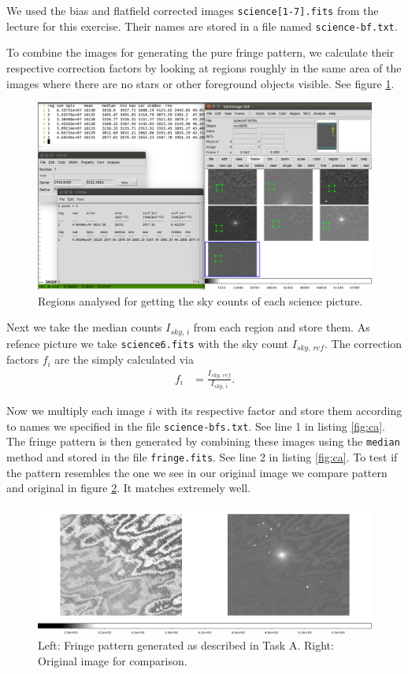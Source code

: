 \documentclass[11pt,a4paper,twoside]{article}
\begin{document}
We used the bias and flatfield corrected images \verb+science[1-7].fits+ from
the lecture for this exercise. Their names are stored in a file named 
\verb+science-bf.txt+.

To combine the images for generating the pure fringe pattern, we calculate their
respective correction factors by looking at regions roughly in the same area
of the images where there are no stars or other foreground objects visible.
See figure \ref{fig:reg}.

\begin{figure}[h!]
\centering
\includegraphics[width=\linewidth]{../pic/regions}
\caption{Regions analysed for getting the sky counts of each science picture.}
\label{fig:reg}
\end{figure}

Next we take the median counts $I_{sky,\,i}$ from each region and store them.
As refence picture we take \verb+science6.fits+ with the sky count $I_{sky,\,ref}$.
The correction factors $f_i$ are the simply calculated via
\begin{align}
    f_i &= \frac{I_{sky,\,ref}}{I_{sky,\,i}} .
\end{align}

Now we multiply each image $i$ with its respective factor and store them
according to names we specified in the file \verb+science-bfs.txt+.
See line 1 in listing \ref{fig:ca}. The fringe pattern is then generated
by combining these images using the \verb+median+ method and stored in the
file \verb+fringe.fits+. See line 2 in listing \ref{fig:ca}. To test if the
pattern resembles the one we see in our original image we compare pattern
and original in figure \ref{fig:fr}. It matches extremely well.

\begin{figure}[h!]
\centering
\includegraphics[width=\linewidth]{../pic/fringes}

\caption{Left: Fringe pattern generated as described in Task A. Right:
         Original image for comparison.}
\label{fig:fr}
\end{figure}
\end{document}
